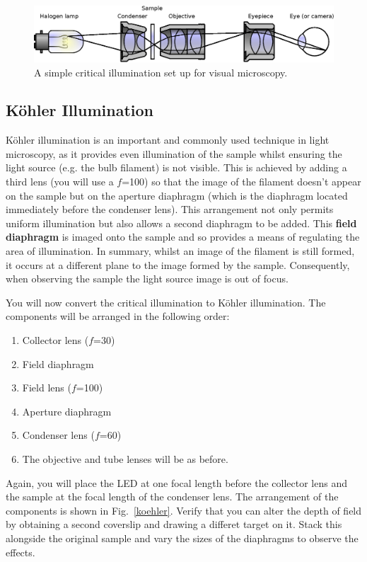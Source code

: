 \documentclass[a4paper]{report}
\begin{document}
\begin{figure}[h]
\center
\includegraphics[width=5in]{Critical_Illumination.eps}
\caption{A simple critical illumination set up for visual microscopy.}
\label{critIlum}
\end{figure}


\subsection{K\"{o}hler Illumination}
K\"{o}hler illumination is an important and commonly used technique in
light microscopy, as it provides even illumination of the sample
whilst ensuring the light source (e.g. the bulb filament) is not
visible. This is achieved by adding a third lens (you will use a
$f$=100) so that the image of the filament doesn't appear on the
sample but on the aperture diaphragm (which is the diaphragm located
immediately before the condenser lens). This arrangement not only
permits uniform illumination but also allows a second diaphragm to be
added. This \textbf{field diaphragm} is imaged onto the sample and so
provides a means of regulating the area of illumination. In summary,
whilst an image of the filament is still formed, it occurs at a
different plane to the image formed by the sample. Consequently, when
observing the sample the light source image is out of focus.

You will now convert the critical illumination to K\"{o}hler
illumination.  The components will be arranged in the following order:
\begin{enumerate}
\item Collector lens ($f$=30)
\item Field diaphragm
\item Field lens ($f$=100)
\item Aperture diaphragm
\item Condenser lens ($f$=60)
\item The objective and tube lenses will be as before. 
\end{enumerate}

Again, you will place the LED at one focal length before the collector
lens and the sample at the focal length of the condenser lens. The
arrangement of the components is shown in Fig.~\ref{koehler}. Verify
that you can alter the depth of field by obtaining a second coverslip
and drawing a differet target on it. Stack this alongside the original
sample and vary the sizes of the diaphragms to observe the effects. 
\end{document}
